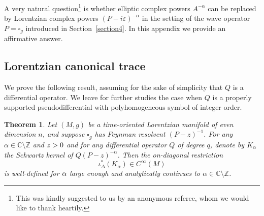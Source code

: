 \documentclass[JEP,XML,SOM,Unicode]{cedram}
\newtheorem{theorem}{Theorem}[section]
\theoremstyle{definition}
\newcommand\cc{{\mathbb C}}
\let\cv\alpha
\let\Im\relax
\let\Re\relax
\DeclareMathOperator{\Im}{Im}
\DeclareMathOperator{\Re}{Re}
\renewcommand{\sec}[1]{Section~\ref{#1}}
\begin{document}
A very natural question\footnote{This was kindly suggested to us by an anonymous referee, whom we would like to thank heartily.} is whether elliptic complex powers $A^{-\cv}$ can be replaced by Lorentzian complex powers $(P-i\varepsilon)^{-\cv}$ in the setting of the wave operator $P=\square_g$ introduced in \sec{section4}. In this appendix we provide an affirmative answer.

\subsection{Lorentzian canonical trace} We prove the following result, assuming for the sake of simplicity that $Q$ is a differential operator. We leave for further studies the case when $Q$ is a properly supported pseudodifferential with polyhomogeneous symbol of integer order.

\begin{theorem}
Let $(M,g)$ be a time-oriented Lorentzian manifold of even dimension $n$, and suppose $\square_g$ has Feynman resolvent $(P-z)^{-1}$. For any $\cv\in\cc\setminus \mathbb{Z}$ and $\Im z > 0$ and for any differential operator $Q$ of degree $q$, denote by $K_\cv$ the Schwartz kernel of $Q(P-z)^{-\cv}$. Then the on-diagonal restriction
\begin{equation*}
\iota_\Delta^*\left(K_\cv \right)\in C^\infty(M)
\end{equation*}
is well-defined for $\Re \cv$ large enough and analytically continues to $\cv\in \mathbb{C}\setminus \mathbb{Z}$.
\end{theorem}
\end{document}
